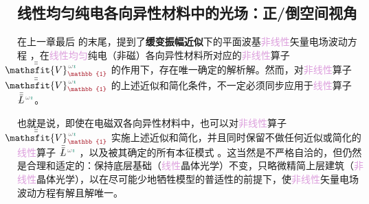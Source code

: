 \vspace*{-4.5em}

\subsection{线性均匀纯电各向异性材料中的光场：正/倒空间视角}\label{ssec:3times2sandwich-eigen-matrices}

在上一章最后  的末尾，提到了\textbf{\textcolor{NavyBlue}{缓变振幅}近似}下的\textcolor{PineGreen}{平面波基}\textcolor{Plum}{非线性}矢量电场波动方程 ，在\textcolor{Plum}{线性}\textcolor{Plum}{均匀}\textcolor{PineGreen}{纯电（非磁）各向异性}材料所对应的\textcolor{Plum}{非线性}算子 $\xint{\mathcolor{gray}{-}}{25}{\bar{\bar{\mathsfit{V}}}}^{\;\! \mathcolor{gray}{\omega} \textcolor{PineGreen}{\imath}}_{\textcolor{Maroon}{\mathbb{1}}}$ 的作用下，存在唯一确定的解析解。然而，对\textcolor{Plum}{非线性}算子 $\xint{\mathcolor{gray}{-}}{25}{\bar{\bar{\mathsfit{V}}}}^{\;\! \mathcolor{gray}{\omega} \textcolor{PineGreen}{\imath}}_{\textcolor{Maroon}{\mathbb{1}}}$ 的上述近似和简化条件，不一定必须同步应用于\textcolor{Plum}{线性}算子 $\xint{\mathcolor{gray}{-}}{30}{\bar{\bar{L}}}^{\;\! \mathcolor{gray}{\omega} \textcolor{PineGreen}{\imath}}$。

也就是说，即使在电磁\textcolor{PineGreen}{双各向异性}材料中，也可以对\textcolor{Plum}{非线性}算子 $\xint{\mathcolor{gray}{-}}{25}{\bar{\bar{\mathsfit{V}}}}^{\;\! \mathcolor{gray}{\omega} \textcolor{PineGreen}{\imath}}_{\textcolor{Maroon}{\mathbb{1}}}$  实施上述近似和简化，并且同时保留不做任何近似或简化的\textcolor{Plum}{线性}算子 $\xint{\mathcolor{gray}{-}}{30}{\bar{\bar{L}}}^{\;\! \mathcolor{gray}{\omega} \textcolor{PineGreen}{\imath}}$ ，以及被其确定的所有\textcolor{PineGreen}{本征模}式 。这当然是不严格自洽的，但仍然是合理和适定的：保持底层基础（\textcolor{Plum}{线性}\textcolor{PineGreen}{晶体光学}）不变，只略微精简上层建筑（\textcolor{Plum}{非线性}\textcolor{PineGreen}{晶体光学}），以在尽可能少地牺牲模型的普适性的前提下，使\textcolor{Plum}{非线性}矢量电场波动方程有解且解唯一。

